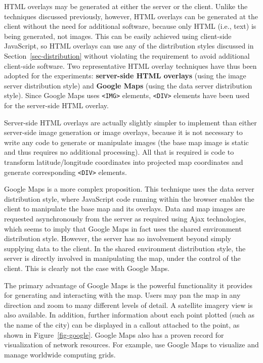 \documentclass[acmnow]{acmtrans2m}
\begin{document}
HTML overlays may be generated at either the server or the client.
Unlike the techniques discussed previously, however, HTML overlays can
be generated at the client without the need for additional software,
because only HTML (i.e., text) is being generated, not images. This can
be easily achieved using client-side JavaScript, so HTML overlays can
use any of the distribution styles discussed in
Section~\ref{sec-distribution} without violating the requirement to
avoid additional client-side software. Two representative HTML overlay
techniques have thus been adopted for the experiments:
\textbf{server-side HTML overlays} (using the image server distribution
style) and \textbf{Google Maps} (using the data server distribution
style). Since Google Maps uses \verb|<IMG>| elements, \verb|<DIV>|
elements have been used for the server-side HTML overlay.

Server-side HTML overlays are actually slightly simpler to implement
than either server-side image generation or image overlays, because it
is not necessary to write any code to generate or manipulate images (the
base map image is static and thus requires no additional processing).
All that is required is code to transform latitude/longitude coordinates
into projected map coordinates and generate corresponding \verb|<DIV>|
elements.

Google Maps \cite{Goog-M-2006-maps} is a more complex proposition. This
technique uses the data server distribution style, where JavaScript code
running within the browser enables the client to manipulate the base map
and its overlays. Data and map images are requested asynchronously from
the server as required using Ajax technologies, which seems to imply
that Google Maps in fact uses the shared environment distribution style.
However, the server has no involvement beyond simply supplying data to
the client. In the shared environment distribution style, the server is
directly involved in manipulating the map, under the control of the
client. This is clearly not the case with Google Maps.

The primary advantage of Google Maps is the powerful functionality it
provides for generating and interacting with the map. Users may pan the
map in any direction and zoom to many different levels of detail. A
satellite imagery view is also available. In addition, further
information about each point plotted (such as the name of the city) can
be displayed in a callout attached to the point, as shown in
Figure~\ref{fig-google}. Google Maps also has a proven record for
visualization of network resources. For example,
 use Google Maps to visualize and manage
worldwide computing grids.
\end{document}
